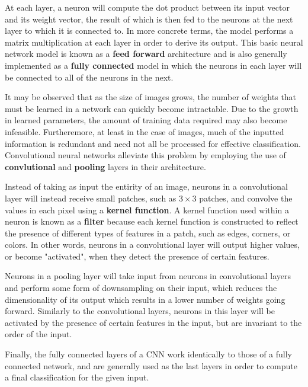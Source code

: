 \documentclass[letterpaper, 12 pt, conference]{ieeeconf}  %
\begin{document}
At each layer, a neuron will compute the dot product between its input vector and its weight vector, the result of which is then fed to the neurons at the next layer to which it is connected to. In more concrete terms, the model performs a matrix multiplication at each layer in order to derive its output. This basic neural network model is known as a \textbf{feed forward} architecture and is also generally implemented as a \textbf{fully connected} model in which the neurons in each layer will be connected to all of the neurons in the next. 
\par
It may be observed that as the size of images grows, the number of weights that must be learned in a network can quickly become intractable. Due to the growth in learned parameters, the amount of training data required may also become infeasible. Furtheremore, at least in the case of images, much of the inputted information is redundant and need not all be processed for effective classification. Convolutional neural networks alleviate this problem by employing the use of \textbf{convlutional} and \textbf{pooling} layers in their architecture.
\par
Instead of taking as input the entirity of an image, neurons in a convolutional layer will instead receive small patches, such as $3\times 3$ patches, and convolve the values in each pixel using a \textbf{kernel function}. A kernel function used within a neuron is known as a \textbf{filter} because each kernel function is constructed to reflect the presence of different types of features in a patch, such as edges, corners, or colors. In other words, neurons in a convolutional layer will output higher values, or become "activated", when they detect the presence of certain features. 
\par
Neurons in a pooling layer will take input from neurons in convolutional layers and perform some form of downsampling on their input, which reduces the dimensionality of its output which results in a lower number of weights going forward. Similarly to the convolutional layers, neurons in this layer will be activated by the presence of certain features in the input, but are invariant to the order of the input. 
\par
Finally, the fully connected layers of a CNN work identically to those of a fully connected network, and are generally used as the last layers in order to compute a final classification for the given input. 
\par
\end{document}
